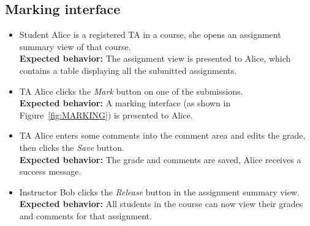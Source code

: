\subsection{Marking interface}
\begin{itemize}
    \item Student Alice is a registered TA in a course, she opens an assignment
        summary view of that course. \\
    {\bf Expected behavior:} The assignment view is presented to Alice, which
        contains a table displaying all the submitted assignments.

    \item TA Alice clicks the \emph{Mark} button on one of the submissions.\\
    {\bf Expected behavior:} A marking interface (as shown in
    Figure~\ref{fig:MARKING}) is presented to Alice.

    \item TA Alice enters some comments into the comment area and edits the
        grade, then clicks the \emph{Save} button. \\
    {\bf Expected behavior:} The grade and comments are saved, Alice receives
        a success message.

    \item Instructor Bob clicks the \emph{Release} button in the assignment
        summary view. \\
    {\bf Expected behavior:} All students in the course can now view their
        grades and comments for that assignment.
\end{itemize}